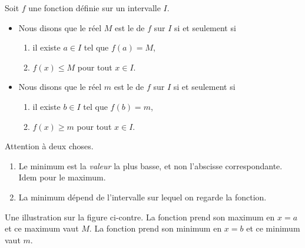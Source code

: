 \begin{definition}
      Soit $f$ une fonction définie sur un intervalle \( I\).
      \begin{itemize}
            \item 
                Nous disons que le réel \( M\) est le  de \( f\) sur $I$ si et seulement si 
                \begin{enumerate}
                    \item
                        il existe $ a\in I$ tel que $f(a)=M$,
                    \item
                        \( f(x)\leq M\) pour tout $x\in I$.
                \end{enumerate}
                
          \item 
                Nous disons que le réel \( m\) est le  de \( f\) sur $I$ si et seulement si
                \begin{enumerate}
                    \item
                        il existe $ b\in I$ tel que $f(b)=m$,
                    \item
                        $f(x)\geq m$ pour tout \( x\in I\).
                \end{enumerate}
      \end{itemize}
\end{definition}

\begin{figure}
   \vspace{-0.5cm}        %
   \centering
   
\end{figure}

\begin{remark}
    Attention à deux choses.
    \begin{enumerate}
        \item
            Le minimum est la \emph{valeur} la plus basse, et non l'abscisse correspondante. Idem pour le maximum. 
        \item
            La minimum dépend de l'intervalle sur lequel on regarde la fonction.
    \end{enumerate}
\end{remark}

Une illustration sur la figure ci-contre. La fonction prend son maximum en \( x=a\) et ce maximum vaut \( M\). La fonction prend son minimum en \( x=b\) et ce minimum vaut \( m\).
